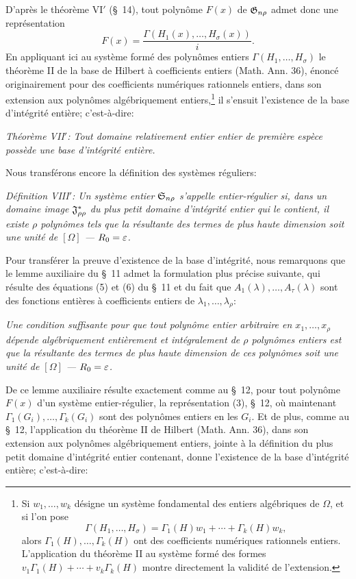 D'après le théorème VI$'$ (\S\ 14), tout polynôme $F(x)$ de $\mathfrak{G}_{n\rho}$ admet donc une représentation
\[
  F(x)=\frac{\Gamma(H_1(x),\ldots,H_\sigma(x))}{i}.
\]
En appliquant ici au système formé des polynômes entiers $\Gamma(H_1,\ldots,H_\sigma)$ le théorème II de la base de Hilbert à coefficients entiers (Math. Ann. 36), énoncé originairement pour des coefficients numériques rationnels entiers, dans son extension aux polynômes algébriquement entiers,\footnote{Si $w_1,\ldots,w_k$ désigne un système fondamental des entiers algébriques de $\Omega$, et si l'on pose
\[
  \Gamma(H_1,\ldots,H_\sigma)=\Gamma_1(H)w_1+\cdots+\Gamma_k(H)w_k,
\]
alors $\Gamma_1(H),\ldots,\Gamma_k(H)$ ont des coefficients numériques rationnels entiers. L'application du théorème II au système formé des formes $v_1\Gamma_1(H)+\cdots+v_k\Gamma_k(H)$ montre directement la validité de l'extension.} il s'ensuit l'existence de la base d'intégrité entière; c'est-à-dire:

\emph{Théorème VII$'$: Tout domaine relativement entier entier de première espèce possède une base d'intégrité entière.}

Nous transférons encore la définition des systèmes réguliers:

\emph{Définition VIII$'$: Un système entier $\mathfrak{S}_{n\rho}$ s'appelle entier-régulier si, dans un domaine image $\mathfrak{J}^*_{\rho\rho}$ du plus petit domaine d’intégrité entier qui le contient, il existe $\rho$ polynômes tels que la résultante des termes de plus haute dimension soit une unité de $[\Omega]$ --- $R_0=\varepsilon$.}

Pour transférer la preuve d'existence de la base d'intégrité, nous remarquons que le lemme auxiliaire du \S\ 11 admet la formulation plus précise suivante, qui résulte des équations (5) et (6) du \S\ 11 et du fait que $A_1(\lambda),\ldots,A_\tau(\lambda)$ sont des fonctions entières à coefficients entiers de $\lambda_1,\ldots,\lambda_\rho$:

\emph{Une condition suffisante pour que tout polynôme entier arbitraire en $x_1,\ldots,x_\rho$ dépende algébriquement entièrement et intégralement de $\rho$ polynômes entiers est que la résultante des termes de plus haute dimension de ces polynômes soit une unité de $[\Omega]$ --- $R_0=\varepsilon$.}

De ce lemme auxiliaire résulte exactement comme au \S\ 12, pour tout polynôme $F(x)$ d'un système entier-régulier, la représentation (3), \S\ 12, où maintenant $\Gamma_1(G_i),\ldots,\Gamma_k(G_i)$ sont des polynômes entiers en les $G_i$. Et de plus, comme au \S\ 12, l'application du théorème II de Hilbert (Math. Ann. 36), dans son extension aux polynômes algébriquement entiers, jointe à la définition du plus petit domaine d’intégrité entier contenant, donne l'existence de la base d'intégrité entière; c'est-à-dire:

